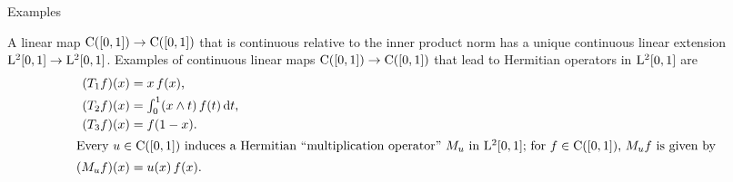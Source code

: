 \documentclass[main.tex]{subfiles}
\begin{document}
\begin{psec}{5.5}{Examples}
\begin{enumerate}
A linear map $\mathrm{C}([0,1])\rightarrow\mathrm{C}([0,1])$
that is continuous relative to the inner product norm
has a unique continuous linear extension
$\mathrm{L}^2[0,1]\rightarrow\mathrm{L}^2[0,1]$.
Examples of continuous linear maps
$\mathrm{C}([0,1])\rightarrow\mathrm{C}([0,1])$ that
lead to Hermitian operators in $\mathrm{L}^2[0,1]$ are
\begin{align*}
(T_1 f)(x) &= x\,f(x)\htam{,} \\
(T_2 f)(x) &= \textstyle{\int_0^1} (x\wedge t)\,f(t)\,\mathrm{d}t \htam{,} \\
(T_3 f)(x) &= f(1-x)\htam{.} \\%
\intertext{%
Every $u\in\Cont{[0,1]}$ induces a Hermitian 
``multiplication operator''~$M_u$
in $\Leb^2[0,1]$;
for $f\in \Cont{[0,1]}$,
$M_uf$ is given by
}%
(M_uf)(x) &= u(x)\,f(x)\htam{.}
\end{align*}
\end{enumerate}
\end{psec}
%
%
\end{document}
